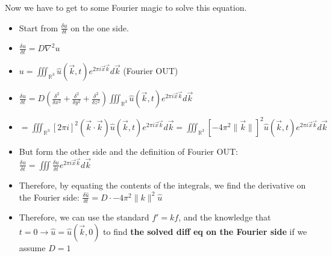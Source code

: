 \documentclass[11pt, oneside]{article}   	%
\begin{document}
\begin{itemize}
Now we have to get to some Fourier magic to solve this equation.
\begin{itemize}
\item Start from $\frac{\delta u}{\delta t}$ on the one side.
\item  $\frac{\delta u}{\delta t} = D\nabla ^2 u$
\item $u = \iiint_{\mathbb{R}^3} \hat{u}(\vec{k}, t)e^{2\pi i \vec{x}\vec{k}}d\vec{k}$ (Fourier OUT)
\item $\frac{\delta u}{\delta t} = D( \frac{\delta ^2}{\delta x^2} +  \frac{\delta ^2}{\delta y^2}  + \frac{\delta ^2}{\delta z^2} ) \iiint_{\mathbb{R}^3} \hat{u}(\vec{k}, t)e^{2\pi i \vec{x}\vec{k}}d\vec{k}$
\item $=\iiint_{\mathbb{R}^3} [2\pi i]^2(\vec{k}\cdot\vec{k}) \hat{u}(\vec{k}, t)e^{2\pi i \vec{x}\vec{k}}d\vec{k} =\iiint_{\mathbb{R}^3} [-4\pi^2\|\vec{k}\|]^2\hat{u}(\vec{k}, t)e^{2\pi i \vec{x}\vec{k}}d\vec{k} $
\item But form the other side and the definition of Fourier OUT: $\frac{\delta u}{\delta t} = \iiint \frac{\delta u}{\delta t} e^{2\pi i \vec{x}\vec{k}}d\vec{k} $
\item Therefore, by equating the contents of the integrals, we find the derivative on the Fourier side: $\frac{\delta \hat{u}}{\delta t} = D\cdot -4\pi^2\|k\|^2\hat{u}$
\item Therefore, we can use the standard $f' = kf$, and the knowledge that $t=0 \rightarrow \hat{u} = \hat{u}(\vec{k}, 0)$ to find \textbf{the solved diff eq on the Fourier side}  if we assume $D=1$
\end{itemize}


\end{itemize}
\end{document}
